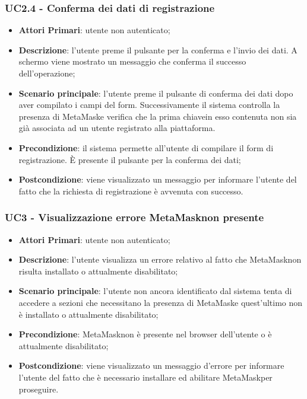 \subsubsection{UC2.4 - Conferma dei dati di registrazione}
\begin{itemize}
	\item \textbf{Attori Primari}: utente non autenticato;
	\item \textbf{Descrizione}:
	l'utente preme il pulsante per la conferma e l'invio dei dati. A schermo viene mostrato un messaggio che conferma il successo dell'operazione;
	\item \textbf{Scenario principale}: l'utente preme il pulsante di conferma dei dati dopo aver compilato i campi del form. Successivamente il sistema controlla la presenza di MetaMask\glosp e verifica che la prima chiave\glosp in esso contenuta non sia già associata ad un utente registrato alla piattaforma.
	\item \textbf{Precondizione}: il sistema permette all'utente di compilare il form di registrazione. \`E presente il pulsante per la conferma dei dati;
	\item \textbf{Postcondizione}: viene visualizzato un messaggio per informare l'utente del fatto che la richiesta di registrazione è avvenuta con successo.
\end{itemize}

\subsubsection{UC3 - Visualizzazione errore MetaMask\glosp non presente}
\begin{itemize}
	\item \textbf{Attori Primari}: utente non autenticato;
	\item \textbf{Descrizione}: l'utente visualizza un errore relativo al fatto che MetaMask\glosp non risulta installato o attualmente disabilitato;
	\item \textbf{Scenario principale}: l'utente non ancora identificato dal sistema tenta di accedere a sezioni che necessitano la presenza di MetaMask\glosp e quest'ultimo non è installato o attualmente disabilitato;
	\item \textbf{Precondizione}: MetaMask\glosp non è presente nel browser dell'utente o è attualmente disabilitato;
	\item \textbf{Postcondizione}: viene visualizzato un messaggio d'errore per informare l'utente del fatto che è necessario installare ed abilitare MetaMask\glosp per proseguire.
	
\end{itemize}

